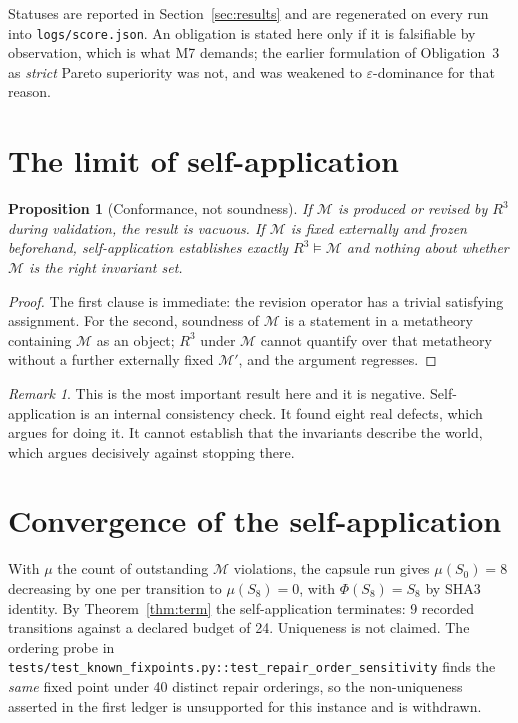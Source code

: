 \documentclass[11pt,a4paper]{article}
\theoremstyle{plain}
\newtheorem{proposition}[theorem]{Proposition}
\theoremstyle{definition}
\theoremstyle{remark}
\newtheorem{remark}[theorem]{Remark}
\newcommand{\Rc}{R^{3}}
\newcommand{\Minv}{\mathcal{M}}
\begin{document}
\noindent Statuses are reported in Section~\ref{sec:results} and are regenerated
on every run into \texttt{logs/score.json}. An obligation is stated here only if
it is falsifiable by observation, which is what M7 demands; the earlier
formulation of Obligation~3 as \emph{strict} Pareto superiority was not, and was
weakened to $\varepsilon$-dominance for that reason.

\section{The limit of self-application}\label{sec:limit}
\begin{proposition}[Conformance, not soundness]
If $\Minv$ is produced or revised by $\Rc$ during validation, the result is
vacuous. If $\Minv$ is fixed externally and frozen beforehand, self-application
establishes exactly $\Rc\models\Minv$ and nothing about whether $\Minv$ is the
right invariant set.
\end{proposition}
\begin{proof}
The first clause is immediate: the revision operator has a trivial satisfying
assignment. For the second, soundness of $\Minv$ is a statement in a metatheory
containing $\Minv$ as an object; $\Rc$ under $\Minv$ cannot quantify over that
metatheory without a further externally fixed $\Minv'$, and the argument
regresses.
\end{proof}
\begin{remark}
This is the most important result here and it is negative. Self-application is
an internal consistency check. It found eight real defects, which argues for
doing it. It cannot establish that the invariants describe the world, which
argues decisively against stopping there.
\end{remark}

\section{Convergence of the self-application}
With $\mu$ the count of outstanding $\Minv$ violations, the capsule run gives
$\mu(S_0)=8$ decreasing by one per transition to $\mu(S_8)=0$, with
$\Phi(S_8)=S_8$ by SHA3 identity. By Theorem~\ref{thm:term} the self-application
terminates: 9 recorded transitions against a declared budget of 24. Uniqueness
is not claimed. The ordering probe in
\texttt{tests/test\_known\_fixpoints.py::test\_repair\_order\_sensitivity} finds
the \emph{same} fixed point under 40 distinct repair orderings, so the
non-uniqueness asserted in the first ledger is unsupported for this instance and
is withdrawn.
\end{document}
